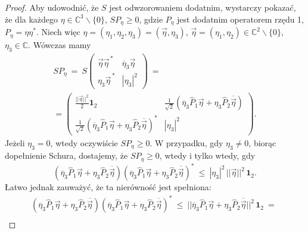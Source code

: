 {\begin{proof}
Aby udowodnić, że $S$ jest odwzorowaniem dodatnim,
wystarczy pokazać, że dla każdego $\eta \in \mathbb{C}^{3}\backslash\{0\}$,
$SP_{\eta} \geq 0$,
gdzie $P_{\eta}$ jest dodatnim operatorem rzędu 1,
$P_{\eta} = \eta \eta^{*}$.
Niech więc
$\eta = (\eta_{1}, \eta_{2}, \eta_{3}) = (\vec{\eta}, \eta_{3})$,
$\vec{\eta} = (\eta_{1}, \eta_{2}) \in \mathbb{C}^{2}\backslash\{0\}$,
$\eta_{3} \in \mathbb{C}$.
Wówczas mamy
\begin{multline}
 SP_{\eta} \:=\:  S \begin{pmatrix}
    \vec{\eta} \vec{\eta}^{\,*} & \overline{\eta}_{3} \vec{\eta} \\
    \eta_{3} \vec{\eta}^{\,*}   & |\eta_{3}|^{2}
 \end{pmatrix} \: = \: \\
 = \begin{pmatrix}
  \frac{||\vec{\eta}||^{2}}{2} \mathbf{1}_{2} &
        \frac{1}{\sqrt{2}} \left ( \overline{\eta}_{3} \hat{P}_{1} \vec{\eta} +
          \eta_{3} \hat{P}_{2} \overline{\vec{\eta}} \right) \\
\frac{1}{\sqrt{2}} \left ( \overline{\eta}_{3} \hat{P}_{1} \vec{\eta} +
          \eta_{3} \hat{P}_{2} \overline{\vec{\eta}} \right)^{*} &
        |\eta_{3}|^{2}
 \end{pmatrix}.
\end{multline}
Jeżeli $\eta_{3} = 0$, wtedy oczywiście $SP_{\eta} \geq 0$.
W przypadku, gdy $\eta_{3} \neq 0$,
biorąc dopełnienie Schura,
dostajemy, że $SP_{\eta} \geq 0$, wtedy i tylko wtedy, gdy
\begin{equation}
\label{ieq:SchurForS}
   \left ( \overline{\eta}_{3} \hat{P}_{1} \vec{\eta} +
    \eta_{3} \hat{P}_{2} \overline{\vec{\eta}} \right)
   \left ( \overline{\eta}_{3} \hat{P}_{1} \vec{\eta} +
    \eta_{3} \hat{P}_{2} \overline{\vec{\eta}} \right)^{*}
    \: \leq \:
        |\eta_{3}|^{2} \, ||\vec{\eta}||^{2} \, \mathbf{1}_{2}.
\end{equation}
Łatwo jednak zauważyć, że ta nierówność jest spełniona:
\begin{multline}
   \left ( \overline{\eta}_{3} \hat{P}_{1} \vec{\eta} +
    \eta_{3} \hat{P}_{2} \overline{\vec{\eta}} \right)
   \left ( \overline{\eta}_{3} \hat{P}_{1} \vec{\eta} +
    \eta_{3} \hat{P}_{2} \overline{\vec{\eta}} \right)^{*} \: \leq \:
|| \overline{\eta}_{3} \hat{P}_{1} \vec{\eta} +
    \eta_{3} \hat{P}_{2}\overline{\vec{\eta}} ||^{2} \, \mathbf{1}_{2}
    \: = \: \\

\end{multline}
\end{proof}}

